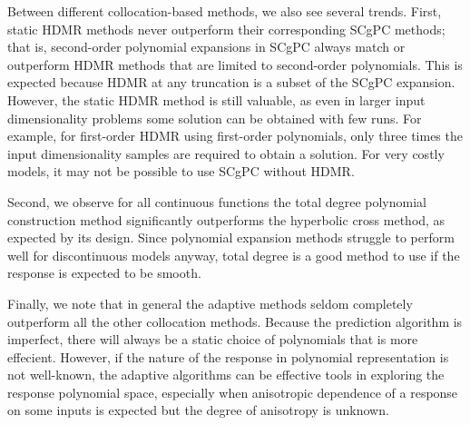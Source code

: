 Between different collocation-based methods, we also see several trends.  First, static HDMR methods never outperform their
corresponding SCgPC methods; that is, second-order polynomial expansions in SCgPC always match or outperform HDMR methods
that are limited to second-order polynomials.  This is expected because HDMR at any truncation is a subset of the SCgPC
expansion.  However, the static HDMR method is still valuable, as even in larger input dimensionality problems some solution
can be obtained with few runs.  For example, for first-order HDMR using first-order polynomials, only three times the input
dimensionality samples are required to obtain a solution.  For very costly models, it may not be possible to use SCgPC without
HDMR.

Second, we observe for all continuous functions the total degree polynomial construction method significantly outperforms
the hyperbolic cross method, as expected by its design.  Since polynomial expansion methods struggle to perform well for
discontinuous models anyway, total degree is a good method to use if the response is expected to be smooth.

Finally, we note that in general the adaptive methods seldom completely outperform all the other collocation methods.  Because the
prediction algorithm is imperfect, there will always be a static choice of polynomials that is more effecient.  However, if
the nature of the response in polynomial representation is not well-known, the adaptive algorithms can be effective tools in
exploring the response polynomial space, especially when anisotropic dependence of a response on some inputs
is expected but the degree of anisotropy is unknown.

